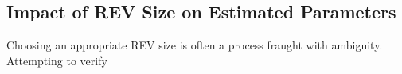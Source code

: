 \subsection{Impact of REV Size on Estimated Parameters}
Choosing an appropriate REV size is often a process fraught with ambiguity. Attempting to verify 